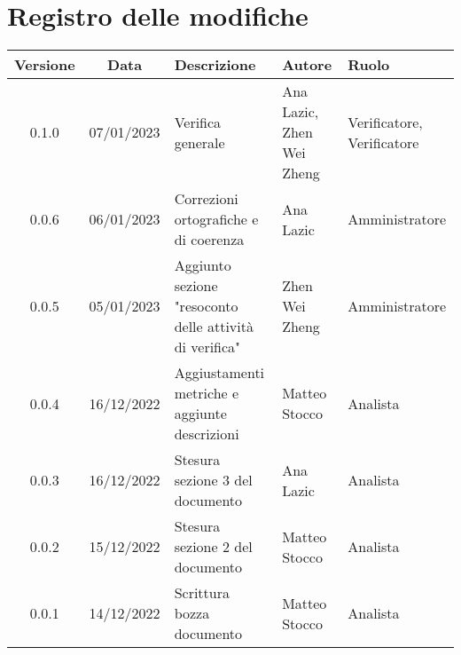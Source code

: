 \section*{Registro delle modifiche}
\begin{table}[H]
	\centering
	\renewcommand\tabularxcolumn[1]{>{\Centering}m{#1}}
	\begin{tabularx}{\textwidth}{| c | c | X | X | X |} 
	\hline
	\textbf{Versione} & \textbf{Data} & \textbf{Descrizione} & \textbf{Autore} & \textbf{Ruolo}\\
    \hline
	0.1.0 & 07/01/2023 & Verifica generale & Ana Lazic, Zhen Wei Zheng & Verificatore, Verificatore \\
    \hline
	0.0.6 & 06/01/2023 & Correzioni ortografiche e di coerenza & Ana Lazic & Amministratore \\
 \hline
	0.0.5 & 05/01/2023 & Aggiunto sezione "resoconto delle attività di verifica" & Zhen Wei Zheng & Amministratore \\
	\hline
	0.0.4 & 16/12/2022 & Aggiustamenti metriche e aggiunte descrizioni & Matteo Stocco & Analista \\
     \hline
	0.0.3 & 16/12/2022 & Stesura sezione 3 del documento & Ana Lazic & Analista \\
	\hline
	0.0.2 & 15/12/2022 & Stesura sezione 2 del documento & Matteo Stocco & Analista \\
	\hline
	0.0.1 & 14/12/2022 & Scrittura bozza documento & Matteo Stocco & Analista \\
	\hline
	\end{tabularx}
\end{table}

